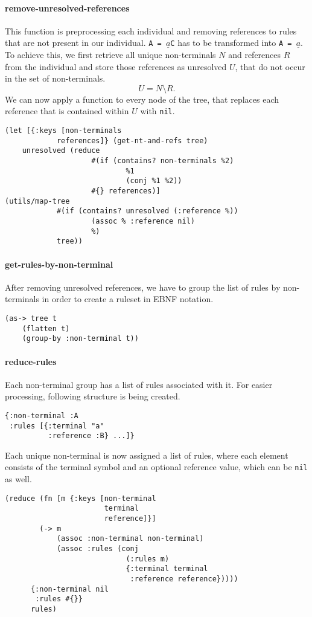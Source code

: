 \documentclass[runningheads]{llncs}
\begin{document}
\paragraph{remove-unresolved-references}
This function is preprocessing each individual and removing references to rules that are not present in our individual.
\texttt{A = $\underline{a}$C}
has to be transformed into
\texttt{A = $\underline{a}$}.
To achieve this, we first retrieve all unique non-terminals $N$ and references $R$ from the individual and store those references as unresolved $U$, that do not occur in the set of non-terminals.
\begin{equation}
    U = N \setminus R.
\end{equation}
We can now apply a function to every node of the tree, that replaces each reference that is contained within $U$ with \texttt{nil}.
\begin{lstlisting}
(let [{:keys [non-terminals
            references]} (get-nt-and-refs tree)
    unresolved (reduce
                    #(if (contains? non-terminals %2)
                            %1
                            (conj %1 %2))
                    #{} references)]
(utils/map-tree
            #(if (contains? unresolved (:reference %))
                    (assoc % :reference nil)
                    %)
            tree))
\end{lstlisting}

\paragraph{get-rules-by-non-terminal}
After removing unresolved references, we have to group the list of rules by non-terminals in order to create a ruleset in EBNF notation.
\begin{lstlisting}
(as-> tree t
    (flatten t)
    (group-by :non-terminal t))
\end{lstlisting}

\paragraph{reduce-rules}
Each non-terminal group has a list of rules associated with it. For easier processing, following structure is being created.
\begin{verbatim}
{:non-terminal :A
 :rules [{:terminal "a"
          :reference :B} ...]}
\end{verbatim}
Each unique non-terminal is now assigned a list of rules, where each element consists of the terminal symbol and an optional reference value, which can be \texttt{nil} as well.
\begin{lstlisting}
(reduce (fn [m {:keys [non-terminal
                       terminal
                       reference]}]
        (-> m
            (assoc :non-terminal non-terminal)
            (assoc :rules (conj
                            (:rules m)
                            {:terminal terminal
                             :reference reference}))))
      {:non-terminal nil
       :rules #{}}
      rules)
\end{lstlisting}
\end{document}
